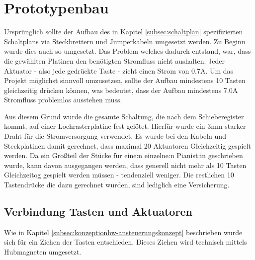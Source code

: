 \section{Prototypenbau} \label{Prototyp}
Ursprünglich sollte der Aufbau des in Kapitel \ref{subsec:schaltplan} spezifizierten Schaltplans via Steckbrettern und
Jumperkabeln umgesetzt werden.
Zu Beginn wurde dies auch so umgesetzt. Das Problem welches dadurch entstand, war, dass die gewählten Platinen den
benötigten Stromfluss nicht aushalten.\newline
Jeder Aktuator - also jede gedrückte Taste - zieht einen Strom von 0.7A. Um das Projekt möglichst sinnvoll umzusetzen,
sollte der Aufbau mindestens 10 Tasten gleichzeitig drücken können, was bedeutet, dass der Aufbau mindestens 7.0A
Stromfluss problemlos ausstehen muss.

Aus diesem Grund wurde die gesamte Schaltung, die nach dem Schieberegister kommt, auf einer Lochrasterplatine fest gelötet.
Hierfür wurde ein 3mm starker Draht für die Stromversorgung verwendet. \newline
Es wurde bei den Kabeln und Steckplatinen damit gerechnet, dass maximal 20 Aktuatoren Gleichzeitig gespielt werden.
Da ein Großteil der Stücke für eine:n einzelne:n Pianist:in geschrieben wurde, kann davon ausgegangen werden, dass
generell nicht mehr als 10 Tasten Gleichzeitog gespielt werden müssen - tendenziell weniger. Die restlichen 10
Tastendrücke die dazu gerechnet wurden, sind lediglich eine Versicherung.

\subsection{Verbindung Tasten und Aktuatoren} \label{subsec:VerbindungTastenAktuatoren}

Wie in Kapitel \ref{subsec:konzeptionhw-ansteuerungskonzept} beschrieben wurde sich für ein Ziehen der Tasten entschieden.
Dieses Ziehen wird technisch mittels Hubmagneten umgesetzt. \newline


